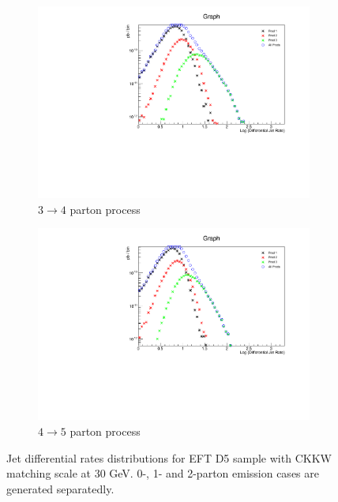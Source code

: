 \begin{figure} [thbp]
\begin{subfigure}{0.48\linewidth}
    \includegraphics[width=\linewidth]{figures/monojet_appendix/HistoJet3to4_30.pdf}
    \caption{$3\rightarrow4$ parton process}
  \end{subfigure}
  \begin{subfigure}{0.48\linewidth}
    \includegraphics[width=\linewidth]{figures/monojet_appendix/HistoJet4to5_30.pdf}
    \caption{$4\rightarrow5$ parton process}
  \end{subfigure}
  \caption{Jet differential rates distributions for EFT D5 sample with CKKW matching scale at 30 GeV. 0-, 1- and 2-parton emission cases are generated separatedly.}
  \label{fig:CKKW_D5_30}
\end{figure}

